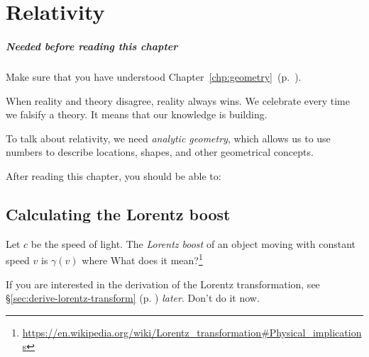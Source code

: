\chapter{Relativity}

\paragraph{Needed before reading this chapter}
Make sure that you have understood Chapter~\ref{chp:geometry}~(p.~\pageref{chp:geometry}).


When reality and theory disagree, reality always wins.
We celebrate every time we falsify a theory.
It means that our knowledge is building.

To talk about relativity, we need \emph{analytic geometry},
which allows us to use numbers to describe locations, shapes, and other geometrical concepts.

After reading this chapter, you should be able to:

\section{Calculating the Lorentz boost}

%
%
Let \(c\) be the speed of light.
The \emph{Lorentz boost} of an object moving with constant speed \(v\) is \(\gamma(v)\) where
What does it mean?\footnote{\url{https://en.wikipedia.org/wiki/Lorentz_transformation\#Physical_implications}}

If you are interested in the derivation of the Lorentz transformation,
see \S\ref{sec:derive-lorentz-transform} (p. \pageref{sec:derive-lorentz-transform}) \emph{later}.
Don't do it now.


